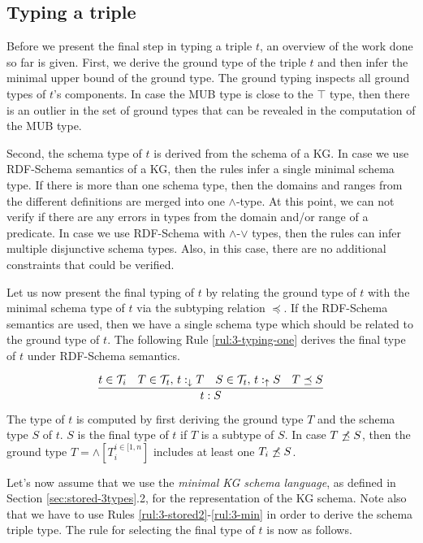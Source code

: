 \documentclass[runningheads]{llncs}
\newcommand{\darr}{\downarrow}
\newcommand{\uarr}{\uparrow}
\newcommand{\T}{{\cal T}}
\begin{document}
\subsection{Typing a triple}

Before we present the final step in typing a triple $t$, an overview
of the work done so far is given. First, we derive the ground type of
the triple $t$ and then infer the minimal upper bound of the ground
type. The ground typing inspects all ground types of $t$'s
components. In case the MUB type is close to the $\top$ type, then
there is an outlier in the set of ground types that can be revealed in
the computation of the MUB type.

Second, the schema type of $t$ is derived from the schema of a KG. In
case we use RDF-Schema semantics of a KG, then the rules infer a
single minimal schema type. If there is more than one schema type,
then the domains and ranges from the different definitions are merged
into one $\land$-type. At this point, we can not verify if there are
any errors in types from the domain and/or range of a predicate. In
case we use RDF-Schema with $\land$-$\lor$ types, then the rules can
infer multiple disjunctive schema types. Also, in this case, there are
no additional constraints that could be verified.

Let us now present the final typing of $t$ by relating the ground type
of $t$ with the minimal schema type of $t$ via the subtyping relation
$\preceq$. If the RDF-Schema semantics are used, then we have a single
schema type which should be related to the ground type of $t$. The
following Rule \ref{rul:3-typing-one} derives the final type of $t$
under RDF-Schema semantics.

\begin{equation}
\label{rul:3-typing-one}
\dfrac{t\in\T_i\quad T\in\T_t,\, t:_{\darr}T\quad S\in\T_t,\, t:_\uarr\/S\quad T\preceq\/S}
      {t:S}
\end{equation}

The type of $t$ is computed by first deriving the ground type $T$ and
the schema type $S$ of $t$. $S$ is the final type of $t$ if $T$ is a
subtype of $S$. In case $T\not\preceq\/S$, then the ground type
$T=\land[T_i^{i\in[1,n}]$ includes at least one $T_i\not\preceq\/S$.

Let's now assume that we use the \emph{minimal KG schema language}, as
defined in Section \ref{sec:stored-3types}.2, for the representation
of the KG schema. Note also that we have to use Rules
\ref{rul:3-stored2}-\ref{rul:3-min} in order to derive the schema
triple type. The rule for selecting the final type of $t$ is now as
follows.
\end{document}
